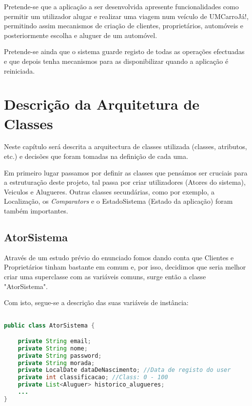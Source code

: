 \documentclass[a4paper,11pt]{report}
\begin{document}
Pretende-se que a aplicação a ser desenvolvida apresente funcionalidades como permitir um utilizador alugar e realizar uma viagem num veículo de UMCarroJá!, permitindo assim mecanismos de criação de clientes, proprietários, automóveis e posteriormente escolha e aluguer de um automóvel.

\vspace{0.5cm}

Pretende-se ainda que o sistema guarde registo de todas as operações efectuadas e que depois tenha mecanismos para as disponibilizar quando a aplicação é reiniciada.


\chapter{Descrição da Arquitetura de Classes}

\hspace{0.50cm} Neste capítulo será descrita a arquitectura de classes utilizada (classes, atributos, etc.) e decisões que foram tomadas na definição de cada uma. \par Em primeiro lugar passamos por definir as classes que pensámos ser cruciais para a estruturação deste projeto, tal passa por criar utilizadores (Atores do sistema), Veiculos e Alugueres. Outras classes secundárias, como por exemplo, a Localização, os \textit{Comparators} e o EstadoSistema (Estado da aplicação) foram também importantes.

\section{AtorSistema}

\hspace{0.50cm} Através de um estudo prévio do enunciado fomos dando conta que Clientes e Proprietários tinham bastante em comum e, por isso, decidimos que seria melhor criar uma superclasse com as variáveis comuns, surge então a classe "AtorSistema".

\vspace{0.5cm}

Com isto, segue-se a descrição das suas variáveis de instância:

\begin{lstlisting}[language=java]

public class AtorSistema {

    private String email; 
    private String nome;
    private String password;
    private String morada;
    private LocalDate dataDeNascimento; //Data de registo do user
    private int classificacao; //Class: 0 - 100
    private List<Aluguer> historico_alugueres;
    ...
}
   
\end{lstlisting}
\end{document}
